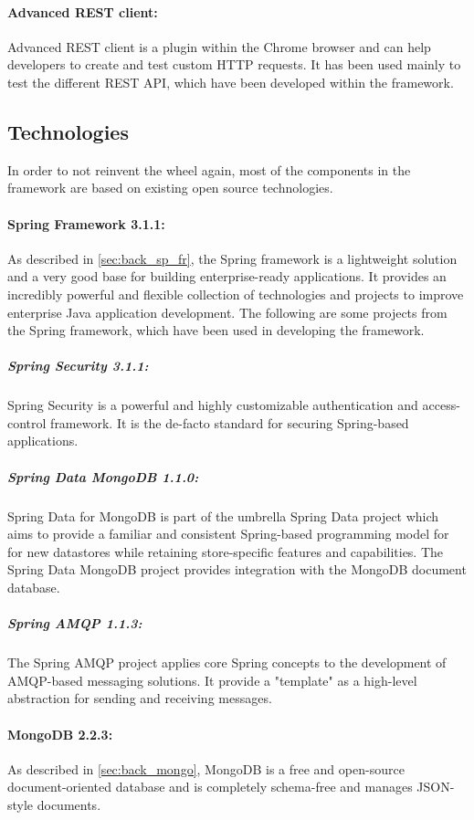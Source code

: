 \paragraph{Advanced REST client:\label{sec:impl_advanced_rest_cl}} Advanced \ac{REST} client is a plugin within the Chrome browser and can help developers to create and test custom \ac{HTTP} requests. It has been used mainly to test the different \ac{REST} API, which have been developed within the framework.

\subsection{Technologies\label{sec:impl_technologies}}
In order to not reinvent the wheel again, most of the components in the framework are based on existing open source technologies. 

\paragraph{Spring Framework 3.1.1:\label{sec:impl_spring}} As described in \ref{sec:back_sp_fr}, the Spring framework is a lightweight solution and a very good base for building enterprise-ready applications. It provides an incredibly powerful and flexible collection of technologies and projects to improve enterprise Java application development. The following are some projects from the Spring framework, which have been used in developing the framework.

\subparagraph{Spring Security 3.1.1:\label{sec:impl_spring_sec}} Spring Security is a powerful and highly customizable authentication and access-control framework. It is the de-facto standard for securing Spring-based applications.

\subparagraph{Spring Data MongoDB 1.1.0:\label{sec:impl_spring_data}} Spring Data for MongoDB is part of the umbrella Spring Data project which aims to provide a familiar and consistent Spring-based programming model for for new datastores while retaining store-specific features and capabilities. The Spring Data MongoDB project provides integration with the MongoDB document database.

\subparagraph{Spring AMQP 1.1.3:\label{sec:impl_spring_amqp}} The Spring AMQP project applies core Spring concepts to the development of AMQP-based messaging solutions. It provide a "template" as a high-level abstraction for sending and receiving messages.

\paragraph{MongoDB 2.2.3:\label{sec:impl_mongo}} As described in \ref{sec:back_mongo}, MongoDB is a free and open-source document-oriented database and is completely schema-free and manages \ac{JSON}-style documents.

